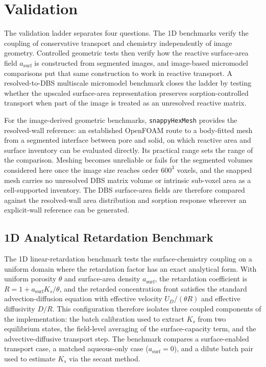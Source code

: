 \section{Validation}\label{sec:validation}

The validation ladder separates four questions. The 1D benchmarks verify the
coupling of conservative transport and chemistry independently of image
geometry. Controlled geometric tests then verify how the reactive surface-area
field $a_{\mathrm{surf}}$ is constructed from segmented images, and image-based
micromodel comparisons put that same construction to work in reactive
transport. A resolved-to-DBS multiscale micromodel benchmark closes the ladder
by testing whether the upscaled surface-area representation preserves
sorption-controlled transport when part of the image is treated as an
unresolved reactive matrix.

For the image-derived geometric benchmarks, \texttt{snappyHexMesh} provides the
resolved-wall reference: an established OpenFOAM route to a body-fitted mesh
from a segmented interface between pore and solid, on which reactive area and
surface inventory can be evaluated directly. Its practical range sets the range
of the comparison. Meshing becomes unreliable or fails for the segmented
volumes considered here once the image size reaches order $600^3$ voxels, and
the snapped mesh carries no unresolved DBS matrix volume or intrinsic sub-voxel
area as a cell-supported inventory. The DBS surface-area fields are therefore
compared against the resolved-wall area distribution and sorption response
wherever an explicit-wall reference can be generated.

\subsection{1D Analytical Retardation Benchmark}\label{sec:1D}

The 1D linear-retardation benchmark tests the surface-chemistry coupling on a
uniform domain where the retardation factor has an exact analytical form.
With uniform porosity $\theta$ and surface-area density $a_{\mathrm{surf}}$,
the retardation coefficient is
$R = 1 + a_{\mathrm{surf}} K_s / \theta$,
and the retarded concentration front satisfies the standard
advection-diffusion equation with effective velocity $U_D / (\theta R)$ and
effective diffusivity $D / R$.
This configuration therefore isolates three coupled components of the
implementation: the batch calibration used to extract $K_s$
from two equilibrium states, the
field-level averaging of the surface-capacity term, and the
advective-diffusive transport step. The benchmark compares a surface-enabled transport case, a
matched aqueous-only case (\mbox{$a_{\mathrm{surf}} = 0$}), and a dilute batch
pair used to estimate $K_s$ via the secant method.

